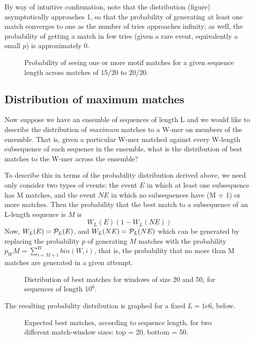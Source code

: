 By way of intuitive confirmation, note that the distribution (figure)
asymptotically approaches 1, so that the probability of generating at
least one match converges to one as the number of tries approaches infinity;
as well, the probability of getting a match in few tries (given a rare
event, equivalently a small $p$) is approximately 0.

\begin{figure}
\caption{Probability of seeing one or more motif matches for a given
sequence length across matches of 15/20 to 20/20.}
\end{figure}

\subsection{Distribution of maximum matches}

Now suppose we have an ensemble of sequences of length L and we would
like to describe the distribution of {\em maximum} matches to a W-mer
on members of the ensemble.
That is, given a particular W-mer matched against every W-length
subsequence of each sequence in the ensemble, what is the distribution
of best matches to the W-mer across the ensemble?

To describe this in terms of the probability distribution derived above,
we need only consider two types of events: the event $E$ in which at least
one subsequence has M matches, and the event $NE$ in which no subsequences
have (M + 1) or more matches.  Then the probability that the best match
to a subsequence of an L-length sequence is $M$ is
\[
W_L(E) (1 - W_L(NE))
\]
Now, $W_L(E) = {\cal P}_L(E)$, and $W_L(NE) = {\cal P}_L(NE)$ which
can be generated by replacing the probability $p$ of generating $M$ matches
with the probability $p_WM = \sum^W_{i=M+1} bin(W, i)$, that is,
the probability that no more than M matches are generated in a given
attempt.

\begin{figure}
\caption{Distribution of best matches for windows of size 20 and 50,
for sequences of length $10^6$.}
\end{figure}

The resulting probability distribution is graphed for a fixed $L = 1e6$,
below.

\begin{figure}
\caption{Expected best matches, according to sequence length,
for two different match-window sizes: top = 20, bottom = 50.}
\end{figure}

